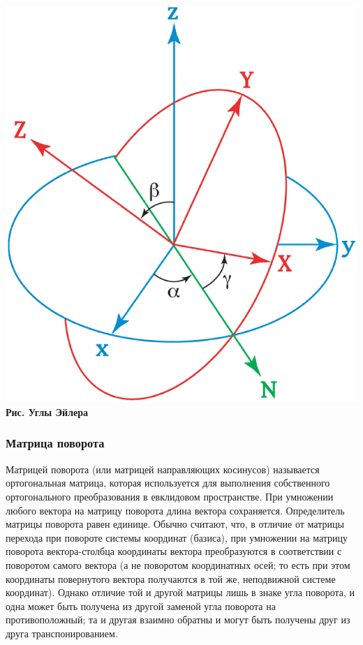 \begin{center}
\includegraphics[scale=0.25]{./Rigidbody/Euler.eps}  \\
\textbf{Рис. Углы Эйлера}
\end{center}

\subsubsection{Матрица поворота}
Матрицей поворота (или матрицей направляющих косинусов) называется ортогональная матрица,
которая используется для выполнения собственного ортогонального преобразования в евклидовом пространстве.
При умножении любого вектора на матрицу поворота длина вектора сохраняется. Определитель матрицы поворота равен единице.
Обычно считают, что, в отличие от матрицы перехода при повороте системы координат (базиса),
при умножении на матрицу поворота вектора-столбца координаты вектора преобразуются в соответствии с поворотом
самого вектора (а не поворотом координатных осей; то есть при этом координаты повернутого вектора получаются в той же,
неподвижной системе координат). Однако отличие той и другой матрицы лишь в знаке угла поворота,
и одна может быть получена из другой заменой угла поворота на противоположный; та и другая взаимно обратны и могут быть получены
друг из друга транспонированием.

